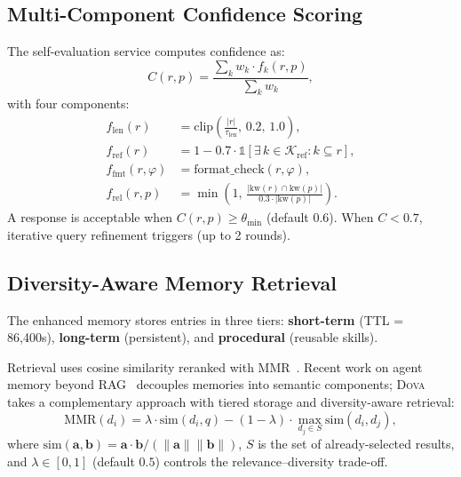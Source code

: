 \documentclass{article}
\theoremstyle{plain}
\theoremstyle{definition}
\newcommand{\dova}{\textsc{Dova}}
\newcommand{\indicator}{\mathbb{1}}
\begin{document}
\subsection{Multi-Component Confidence Scoring}\label{sec:confidence}

The self-evaluation service computes confidence as:
\begin{equation}\label{eq:confidence}
  C(r, p) = \frac{\sum_{k} w_k \cdot f_k(r, p)}{\sum_{k} w_k},
\end{equation}
with four components:
\begin{align}
  f_\mathrm{len}(r) &= \mathrm{clip}\!\left(\tfrac{|r|}{\tau_\mathrm{len}},\, 0.2,\, 1.0\right), \label{eq:f_len} \\
  f_\mathrm{ref}(r) &= 1 - 0.7 \cdot \indicator[\exists\, k {\in} \mathcal{K}_\mathrm{ref}\!: k {\subseteq} r], \label{eq:f_ref} \\
  f_\mathrm{fmt}(r, \varphi) &= \mathrm{format\_check}(r, \varphi), \label{eq:f_fmt} \\
  f_\mathrm{rel}(r, p) &= \min\!\left(1,\, \tfrac{|\mathrm{kw}(r) \cap \mathrm{kw}(p)|}{0.3 \cdot |\mathrm{kw}(p)|}\right). \label{eq:f_rel}
\end{align}
A response is acceptable when $C(r, p) \geq \theta_\mathrm{min}$ (default
$0.6$).  When $C < 0.7$, iterative query refinement triggers (up to 2 rounds).

\subsection{Diversity-Aware Memory Retrieval}\label{sec:memory}

The enhanced memory stores entries in three tiers:
\textbf{short-term} (TTL = 86,400s),
\textbf{long-term} (persistent), and
\textbf{procedural} (reusable skills).

Retrieval uses cosine similarity reranked with
MMR~\citep{carbonell1998mmr}.  Recent work on agent memory beyond
RAG~\citep{hu2026xmemory} decouples memories into semantic components;
\dova{} takes a complementary approach with tiered storage and
diversity-aware retrieval:
\begin{equation}\label{eq:mmr}
  \mathrm{MMR}(d_i) = \lambda \!\cdot\! \mathrm{sim}(d_i, q)
  - (1{-}\lambda) \!\cdot\! \max_{d_j \in S} \mathrm{sim}(d_i, d_j),
\end{equation}
where $\mathrm{sim}(\mathbf{a}, \mathbf{b}) = \mathbf{a}{\cdot}\mathbf{b} /
(\|\mathbf{a}\| \|\mathbf{b}\|)$, $S$ is the set of already-selected results,
and $\lambda \in [0, 1]$ (default $0.5$) controls the relevance--diversity
trade-off.
\end{document}

